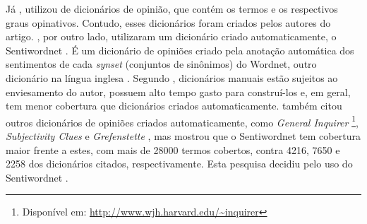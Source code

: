 \documentclass[template.tex]{subfiles}
\begin{document}

%
%

Já , utilizou de dicionários de opinião, que contém os termos e os respectivos graus opinativos. Contudo, esses dicionários foram criados pelos autores do artigo. , por outro lado, utilizaram um dicionário criado automaticamente, o Sentiwordnet \cite{esuli2006sentiwordnet}. É um dicionário de opiniões criado pela anotação automática dos sentimentos de cada \textit{synset} (conjuntos de sinônimos) do Wordnet, outro dicionário na língua inglesa \cite{fellbaum2005wordnet}. Segundo , dicionários manuais estão sujeitos ao enviesamento do autor, possuem alto tempo gasto para construí-los e, em geral, tem menor cobertura que dicionários criados automaticamente.  também citou outros dicionários de opiniões criados automaticamente, como \textit{General Inquirer} \cite{stone1966general} \footnote{Disponível em: \url{http://www.wjh.harvard.edu/~inquirer}}, \textit{Subjectivity Clues} \cite{wilson2005recognizing} e \textit{Grefenstette} \cite{grefenstette2004coupling}, mas mostrou que o Sentiwordnet tem cobertura maior frente a estes, com mais de 28000 termos cobertos, contra 4216, 7650 e 2258 dos dicionários citados, respectivamente. Esta pesquisa decidiu pelo uso do Sentiwordnet \cite{esuli2006sentiwordnet}.
\end{document}
